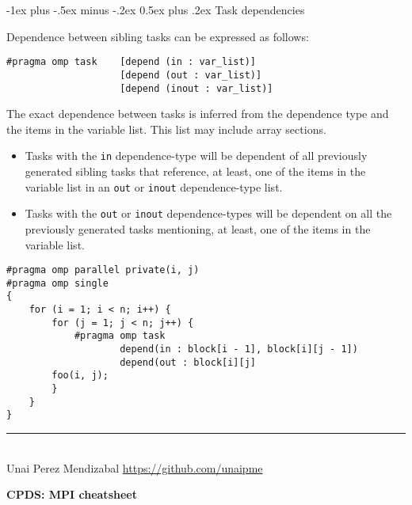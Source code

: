 \documentclass[10pt,landscape]{article}
\makeatletter
\renewcommand{\section}{\@startsection{section}{1}{0mm}%
                                {-1ex plus -.5ex minus -.2ex}%
                                {0.5ex plus .2ex}%
                                {\normalfont\large\bfseries}}
\makeatother
\begin{document}
\begin{multicols}{3}
\section{Task dependencies}
\par
Dependence between sibling tasks can be expressed as follows:
\begin{verbatim}
#pragma omp task    [depend (in : var_list)]
                    [depend (out : var_list)]
                    [depend (inout : var_list)]
\end{verbatim}
\par
The exact dependence between tasks is inferred from the dependence type and the items in the variable list. This list may include array sections.
\begin{itemize}
\item Tasks with the \texttt{in} dependence-type will be dependent of all previously generated sibling tasks that reference, at least, one of the items in the variable list in an \texttt{out} or \texttt{inout} dependence-type list.
\item Tasks with the \texttt{out} or \texttt{inout} dependence-types will be dependent on all the previously generated tasks mentioning, at least, one of the items in the variable list.
\end{itemize}
\begin{verbatim}
#pragma omp parallel private(i, j)
#pragma omp single
{
    for (i = 1; i < n; i++) {
        for (j = 1; j < n; j++) {
            #pragma omp task
                    depend(in : block[i - 1], block[i][j - 1])
                    depend(out : block[i][j]
        foo(i, j);
        }
    }
}
\end{verbatim}
\vfill
\hrule
~\\
Unai Perez Mendizabal \textcopyright \href{https://github.com/unaipme}{https://github.com/unaipme}
\end{multicols}
\newpage\begin{center}
 \Large{\textbf{CPDS: MPI cheatsheet}} \\
\end{center}
\end{document}
